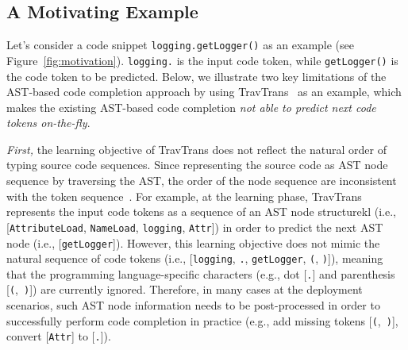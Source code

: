 \subsection{A Motivating Example}






Let's consider a code snippet \texttt{logging.getLogger()} as an example (see Figure~\ref{fig:motivation}).
\texttt{logging.} is the input code token, while \texttt{getLogger()} is the code token to be predicted.
Below, we illustrate two key limitations of the AST-based code completion approach by using TravTrans~\cite{kim2021code} as an example, which makes the existing AST-based code completion \emph{not able to predict next code tokens on-the-fly}.

\emph{First,} the learning objective of TravTrans does not reflect the natural order of typing source code sequences.
Since representing the source code as AST node sequence by traversing the AST, the order of the node sequence are inconsistent with the token sequence~\cite{liu2022unified}.
For example, at the learning phase, TravTrans~\cite{kim2021code} represents the input code tokens as a sequence of an AST node structurekl (i.e., [\texttt{AttributeLoad}, \texttt{NameLoad}, \texttt{logging}, \texttt{Attr}]) in order to predict the next AST node (i.e., [\texttt{getLogger}]).
However, this learning objective does not mimic the natural sequence of code tokens (i.e., [\texttt{logging}, \texttt{.}, \texttt{getLogger}, \texttt{(}, \texttt{)}]), meaning that the programming language-specific characters (e.g., dot [\texttt{.}] and parenthesis [\texttt{(},~\texttt{)}]) are currently ignored.
Therefore, in many cases at the deployment scenarios, such AST node information needs to be post-processed in order to successfully perform code completion in practice (e.g., add missing tokens [\texttt{(},~\texttt{)}], convert [\texttt{Attr}] to [\texttt{.}]).

